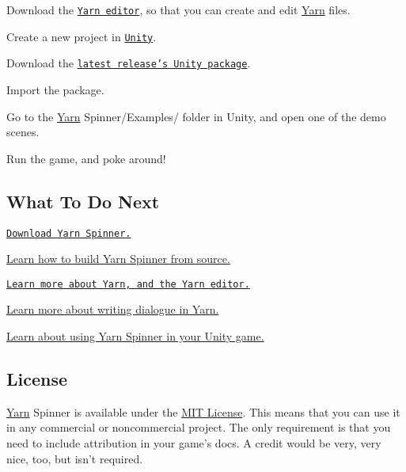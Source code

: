 \begin{DoxyEnumerate}
\item Download the \href{https://github.com/InfiniteAmmoInc/Yarn}{\tt Yarn editor}, so that you can create and edit \hyperlink{a00026}{Yarn} files.
\end{DoxyEnumerate}
\begin{DoxyEnumerate}
\item Create a new project in \href{https://unity3d.com/get-unity}{\tt Unity}.
\item Download the \href{https://github.com/thesecretlab/YarnSpinner/releases}{\tt latest release's Unity package}.
\item Import the package.
\item Go to the {\ttfamily \hyperlink{a00026}{Yarn} Spinner/\-Examples/} folder in Unity, and open one of the demo scenes.
\item Run the game, and poke around!
\end{DoxyEnumerate}

\subsection*{What To Do Next}


\begin{DoxyItemize}
\item \href{https://github.com/thesecretlab/YarnSpinner/releases}{\tt Download Yarn Spinner.}
\item \hyperlink{a00006}{Learn how to build Yarn Spinner from source.}
\item \href{https://github.com/infiniteammoinc/Yarn}{\tt Learn more about Yarn, and the Yarn editor.}
\item \hyperlink{a00014}{Learn more about writing dialogue in Yarn.}
\item \hyperlink{a00012}{Learn about using Yarn Spinner in your Unity game.}
\end{DoxyItemize}

\subsection*{License}

\hyperlink{a00026}{Yarn} Spinner is available under the \hyperlink{a00016}{M\-I\-T License}. This means that you can use it in any commercial or noncommercial project. The only requirement is that you need to include attribution in your game's docs. A credit would be very, very nice, too, but isn't required.


